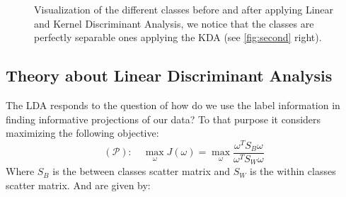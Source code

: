 \documentclass[11pt,a4paper,oneside]{article}
\begin{document}
\begin{figure}[ht!]
\begin{center}
\end{center}
\caption{Visualization of the different classes before and after applying Linear and Kernel Discriminant Analysis, we notice that the classes are perfectly separable ones applying the KDA (see \ref{fig:second} right).}
\end{figure}

\subsection{Theory about Linear Discriminant Analysis}
The LDA responds to the question of how do we use the label information in finding informative projections of our data? To that purpose it considers maximizing the following objective:
\begin{equation}
(\mathcal{P}):\quad \max_{\omega} J(\omega) = \max_{\omega} \frac{\omega^T S_B \omega}{\omega^T S_W \omega}
\end{equation}
Where $S_B$ is the between classes scatter matrix and $S_W$ is the within classes scatter matrix. And are given by:
\end{document}
